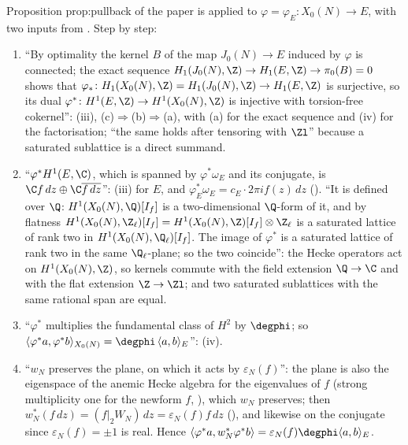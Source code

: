 \begin{paperlink}\label{pl:curves:pullback}
Proposition prop:pullback of the paper is  applied to $\varphi=\varphi_E\colon X_0(N)\to E$, with two inputs from
. Step by step:
\begin{enumerate}[label=(\alph*)]
\item ``By optimality the kernel $B$ of the map $J_0(N)\to E$ induced by $\varphi$ is connected; the exact sequence $H_1(J_0(N),\Z)\to H_1(E,\Z)\to\pi_0(B)=0$ shows that $\varphi_*\colon H_1(X_0(N),\Z)=H_1(J_0(N),\Z)\to H_1(E,\Z)$ is surjective,
so its dual $\varphi^*\colon H^1(E,\Z)\to H^1(X_0(N),\Z)$ is injective with torsion-free cokernel'': (iii), (c)$\Rightarrow$(b)$\Rightarrow$(a), with (a) for the exact
sequence and (iv) for the factorisation; ``the same holds after tensoring with $\Zl$'' because a saturated sublattice is a direct summand.
\item ``$\varphi^*H^1(E,\C)$, which is spanned by $\varphi^*\omega_E$ and its conjugate, is $\C f\,dz\oplus\C\overline{f\,dz}$'': (iii) for $E$, and
$\varphi_E^*\omega_E=c_E\cdot2\pi if(z)\,dz$ (). ``It is defined over $\Q$: $H^1(X_0(N),\Q)[I_f]$ is a two-dimensional $\Q$-form of it, and by flatness $H^1(X_0(N),\Z_\ell)[I_f]=H^1(X_0(N),\Z)[I_f]\otimes\Z_\ell$ is a saturated
lattice of rank two in $H^1(X_0(N),\Q_\ell)[I_f]$. The image of $\varphi^*$ is a saturated lattice of rank two in the same $\Q_\ell$-plane; so the two coincide'': the Hecke operators act on
$H^1(X_0(N),\Z)$, so kernels commute with the field extension $\Q\to\C$ and with the flat extension $\Z\to\Zl$; and two saturated sublattices with the same rational span are equal.
\item ``$\varphi^*$ multiplies the fundamental class of $H^2$ by $\degphi$; so $\langle\varphi^*a,\varphi^*b\rangle_{X_0(N)}=\degphi\,\langle a,b\rangle_E$'': (iv).
\item ``$w_N$ preserves the plane, on which it acts by $\varepsilon_N(f)$'': the plane is also the eigenspace of the anemic Hecke algebra for the eigenvalues of $f$ (strong multiplicity one
for the newform $f$, ), which $w_N$ preserves; then $w_N^*(f\,dz)=(f|_2W_N)\,dz=\varepsilon_N(f)f\,dz$ (), and likewise on the conjugate since
$\varepsilon_N(f)=\pm1$ is real. Hence $\langle\varphi^*a,w_N^*\varphi^*b\rangle=\varepsilon_N(f)\degphi\langle a,b\rangle_E$.

\end{enumerate}
\end{paperlink}
